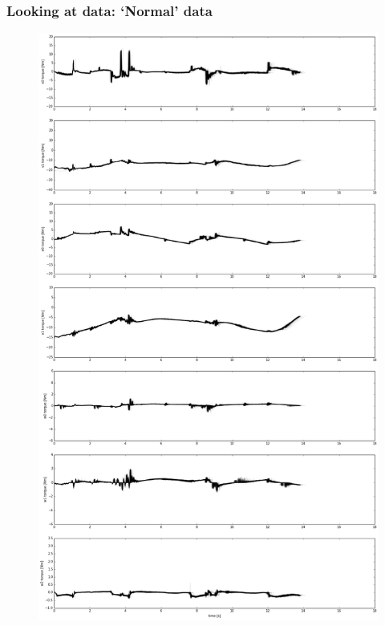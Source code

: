 \documentclass[%
USenglish,%
pdftex,%
compress,%
10pt,%
svgnames%
,handout
]
{beamer}
\begin{document}
\begin{frame}
\begin{columns}[onlytextwidth]
\begin{column}{.4\textwidth}
\begin{figure}
            \end{figure}
        \end{column}
    \end{columns}
\end{frame}

\newcommand{\datawidth}{.43\textwidth}
\begin{frame}
	\frametitle{Looking at data: `Normal' data}
	\begin{figure}
        \centering
        \includegraphics[width=\datawidth]{figs/no_anomaly3.png}
    \end{figure}
\end{frame}
\end{document}
